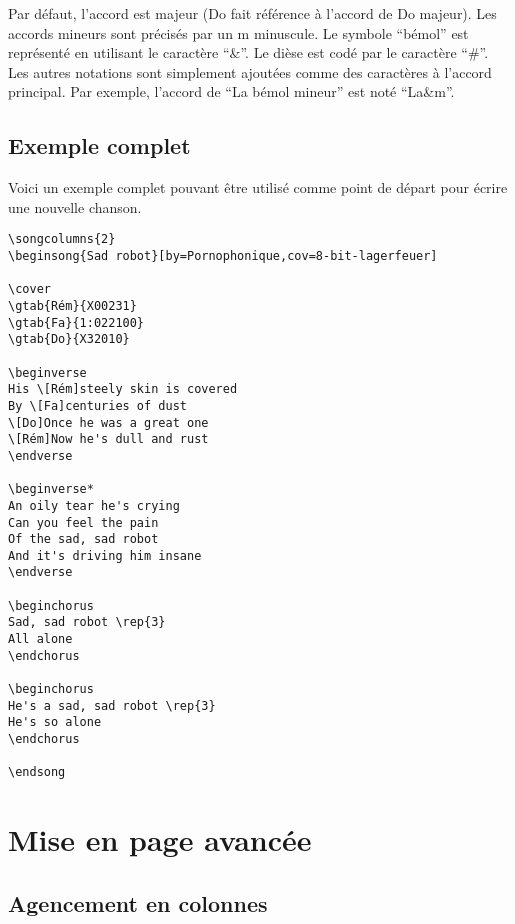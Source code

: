 \documentclass[a4paper,twoside]{article}
\begin{document}
Par défaut, l'accord est majeur (Do fait référence à l'accord de Do
majeur). Les accords mineurs sont précisés par un m minuscule.  Le
symbole ``bémol'' est représenté en utilisant le caractère ``\&''.  Le
dièse est codé par le caractère ``\#''. Les autres notations sont
simplement ajoutées comme des caractères à l'accord principal. Par
exemple, l'accord de ``La bémol mineur'' est noté ``La\&m''.


\subsection{Exemple complet}

Voici un exemple complet pouvant être utilisé comme point de départ
pour écrire une nouvelle chanson.

\begin{verbatim}
\songcolumns{2}
\beginsong{Sad robot}[by=Pornophonique,cov=8-bit-lagerfeuer]

\cover
\gtab{Rém}{X00231}
\gtab{Fa}{1:022100}
\gtab{Do}{X32010}

\beginverse
His \[Rém]steely skin is covered
By \[Fa]centuries of dust
\[Do]Once he was a great one
\[Rém]Now he's dull and rust
\endverse

\beginverse*
An oily tear he's crying
Can you feel the pain
Of the sad, sad robot
And it's driving him insane
\endverse

\beginchorus
Sad, sad robot \rep{3}
All alone
\endchorus

\beginchorus
He's a sad, sad robot \rep{3}
He's so alone
\endchorus

\endsong
\end{verbatim}

\section{Mise en page avancée}

\subsection{Agencement en colonnes}
\end{document}
